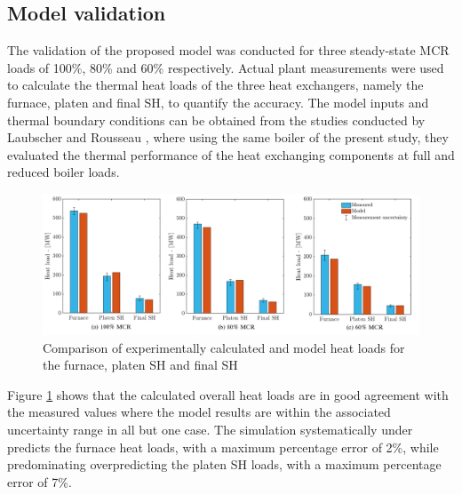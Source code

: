 \documentclass[11pt,cleanfoot]{asme2ej}
\begin{document}
\subsection{Model validation}\label{sec_model_valid}
The validation of the proposed model was conducted for three steady-state MCR loads of 100\%, 80\% and 60\% respectively. Actual plant measurements were used to calculate the thermal heat loads of the three heat exchangers, namely the furnace, platen and final SH, to quantify the accuracy. The model inputs and thermal boundary conditions can be obtained from the studies conducted by Laubscher and Rousseau \cite{Laubscher2019b} \cite{Laubscher2020b}, where using the same boiler of the present study, they evaluated the thermal performance of the heat exchanging components at full and reduced boiler loads.
\begin{figure}[h]
\centerline{\includegraphics[scale = 0.425]{VALIDATION}}
\caption{Comparison of experimentally calculated and model heat loads for the furnace, platen SH and final SH}
\label{fig_heat_valid}
\end{figure}

Figure \ref{fig_heat_valid} shows that the calculated overall heat loads are in good agreement with the measured values where the model results are within the associated uncertainty range in all but one case. The simulation systematically under predicts the furnace heat loads, with a maximum percentage error of 2\%, while predominating overpredicting the platen SH loads, with a maximum percentage error of 7\%.
\end{document}
